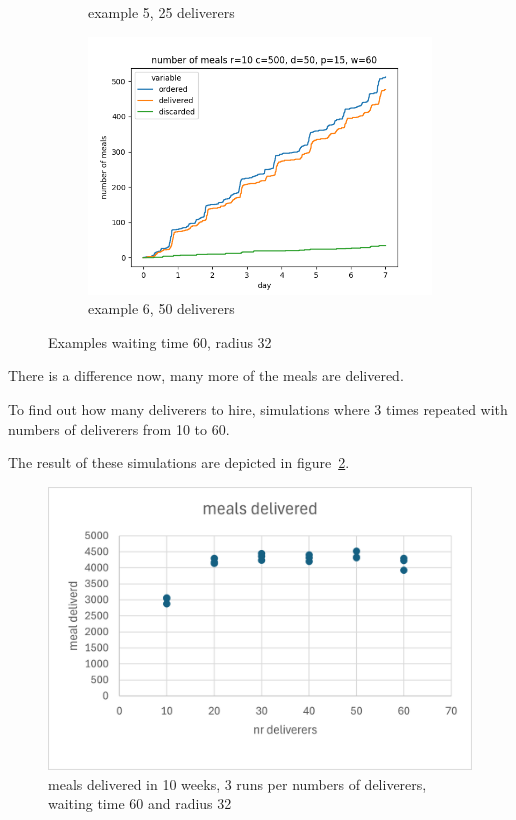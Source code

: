 \begin{center}
\begin{figure}
\begin{subfigure}[m]{0.30\textwidth}
            \caption{example 5, 25 deliverers}
        \end{subfigure}
        \hfill
        \begin{subfigure}[m]{0.30\textwidth}
            \centering
            \includegraphics[width=\textwidth]{sections/run2/week_nm_rad_32food_ordering_distribution_500_10_50_60}
            \caption{example 6, 50 deliverers}
        \end{subfigure}
        \caption{Examples waiting time 60, radius 32 }
        \label{fig:examples 4 5 6}
    \end{figure}
\end{center}

There is a difference now, many more of the meals are delivered.

To find out how many deliverers to hire, simulations where 3 times repeated with numbers of deliverers from 10 to 60.

The result of these simulations are depicted in  figure~\ref{fig:multiruns}.

\begin{figure}
\centering
\includegraphics[width=12cm]{sections/pics/Afbeelding1}
\caption{meals delivered in 10 weeks, 3 runs per numbers of deliverers, waiting time 60 and radius 32 }
\label{fig:multiruns}
\end{figure}

